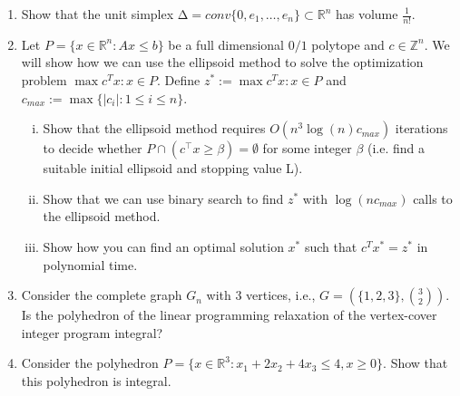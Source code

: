 \documentclass[11pt]{article}
\institute{\'Ecole Polytechnique F\'ed\'erale de Lausanne}
\newcommand{\setR}{\mathbb{R}}
\newcommand{\setZ}{\mathbb{Z}}
\begin{document}
\makeheader

\begin{enumerate}[1)]

\item Show that the unit simplex $∆ = conv\{0,e_1,\hdots,e_n\}⊂\setR^n$ has volume $\frac{1}{n!}$.



\item Let $P= \{x∈\setR^n : Ax≤b\}$ be a full dimensional $0/1$ polytope and $c ∈\setZ^n$. We will show how we
can use the ellipsoid method to solve the optimization problem $\max c^Tx: x∈P$.
Define $z^*:= \max c^Tx: x∈P$ and $c_{max} := \max \{|c_i|: 1 ≤i≤n\}$.
\begin{enumerate}[i)]
\item Show that the ellipsoid method requires $O(n^3 \log(n)c_{max})$ iterations to decide whether $P ∩
(c^⊤x≥β) = ∅$ for some integer $β$ (i.e. find a suitable initial ellipsoid and stopping value L).
\item Show that we can use binary search to find $z^*$ with $\log(nc_{max})$ calls to the ellipsoid method.
\item Show how you can find an optimal solution $x^*$ such that $c^Tx^*= z^*$ in polynomial time.
\end{enumerate}



\item Consider the complete graph $G_n$ with 3 vertices, i.e., $G= (\{1,2,3\}, \binom{3}
{2} )$. Is the polyhedron of the linear programming relaxation of the vertex-cover integer program integral?


\item Consider the polyhedron $P = \{x ∈ \setR^3 : x_1 + 2 x_2 + 4 x_3 ≤ 4, x ≥ 0\}$. Show that this polyhedron is integral. 







\end{enumerate}




  
\end{document}
